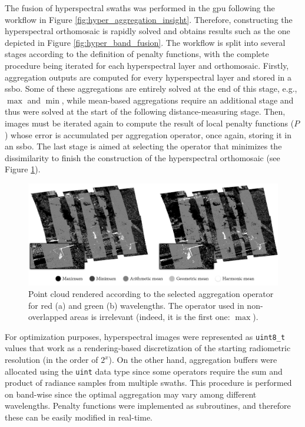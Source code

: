 The fusion of hyperspectral swaths was performed in the \acrshort{gpu} following the workflow in Figure \ref{fig:hyper_aggregation_insight}. Therefore, constructing the hyperspectral orthomosaic is rapidly solved and obtains results such as the one depicted in Figure \ref{fig:hyper_band_fusion}. The workflow is split into several stages according to the definition of penalty functions, with the complete procedure being iterated for each hyperspectral layer and orthomosaic. Firstly, aggregation outputs are computed for every hyperspectral layer and stored in a \acrshort{ssbo}. Some of these aggregations are entirely solved at the end of this stage, e.g., $\max$ and $\min$, while mean-based aggregations require an additional stage and thus were solved at the start of the following distance-measuring stage. Then, images must be iterated again to compute the result of local penalty functions ($P$) whose error is accumulated per aggregation operator, once again, storing it in an \acrshort{ssbo}. The last stage is aimed at selecting the operator that minimizes the dissimilarity to finish the construction of the hyperspectral orthomosaic (see Figure \ref{fig:hyper_aggregation_selection}). 

\begin{figure}[bt]
    \centering
    \includegraphics[width=\linewidth]{figs/hyper_point_cloud/aggregation_selection.png}
	\caption{Point cloud rendered according to the selected aggregation operator for red (a) and green (b) wavelengths. The operator used in non-overlapped areas is irrelevant (indeed, it is the first one: $\max$). }
	\label{fig:hyper_aggregation_selection}
\end{figure}

For optimization purposes, hyperspectral images were represented as \verb|uint8_t| values that work as a rendering-based discretization of the starting radiometric resolution (in the order of $2^x$). On the other hand, aggregation buffers were allocated using the \verb|uint| data type since some operators require the sum and product of radiance samples from multiple swaths. This procedure is performed on band-wise since the optimal aggregation may vary among different wavelengths. Penalty functions were implemented as subroutines, and therefore these can be easily modified in real-time.

